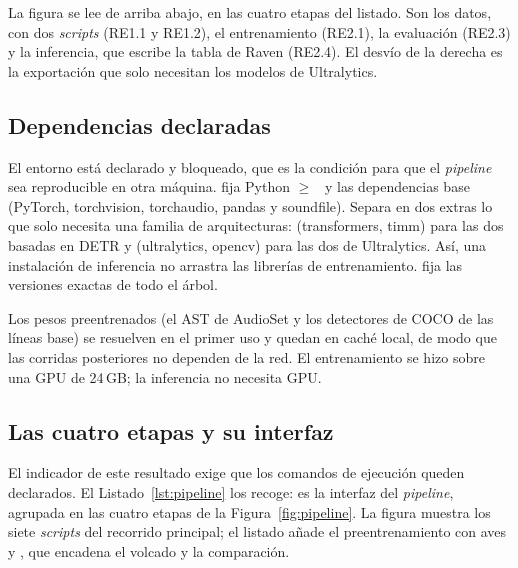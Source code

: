 La figura se lee de arriba abajo, en las cuatro etapas del listado. Son los
datos, con dos \textit{scripts} (RE1.1 y RE1.2), el entrenamiento (RE2.1), la
evaluación (RE2.3) y la inferencia, que escribe la tabla de Raven (RE2.4). El
desvío de la derecha es la exportación que solo necesitan los modelos de
Ultralytics.

\subsection{Dependencias declaradas}

El entorno está declarado y bloqueado, que es la condición para que el
\textit{pipeline} sea reproducible en otra máquina.  fija
Python $\geq$~\rPython{} y las dependencias base (PyTorch, torchvision,
torchaudio, pandas y soundfile). Separa en dos extras lo que solo necesita una
familia de arquitecturas:  (transformers, timm) para las dos basadas en
DETR y  (ultralytics, opencv) para las dos de Ultralytics. Así, una
instalación de inferencia no arrastra las librerías de entrenamiento.
 fija las versiones exactas de todo el árbol.

Los pesos preentrenados (el AST de AudioSet y los detectores de COCO de las
líneas base) se resuelven en el primer uso y quedan en caché local, de modo que las corridas
posteriores no dependen de la red. El entrenamiento se hizo sobre una GPU de
24\,GB; la inferencia no necesita GPU.

\subsection{Las cuatro etapas y su interfaz}

El indicador de este resultado exige que los comandos de ejecución queden
declarados. El Listado~\ref{lst:pipeline} los recoge: es la interfaz del
\textit{pipeline}, agrupada en las cuatro etapas de la Figura~\ref{fig:pipeline}.
La figura muestra los siete \textit{scripts} del recorrido principal; el listado
añade el preentrenamiento con aves y , que encadena el volcado
y la comparación.

